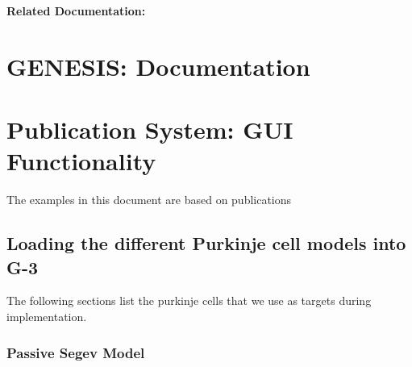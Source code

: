 \documentclass[12pt]{article}
\begin{document}
{\bf Related Documentation:}

\section*{GENESIS: Documentation}

\section{Publication System: GUI Functionality}






The examples in this document are based on publications
\cite{deschutter94:_purkin_i}\cite{deschutter94:_purkin_ii}\cite{schutter94:_simul_purkin}\cite{Rapp-P:1994qf}

\subsection{Loading the different Purkinje cell models into G-3}

The following sections list the purkinje cells that we use as targets
during implementation.

\subsubsection{Passive Segev Model}
\end{document}
